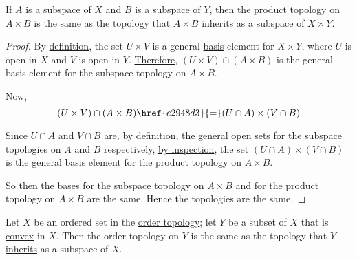 If $A$ is a \href{cddfbd8}{subspace} of $X$ and $B$ is a subspace of $Y$, then
the \href{be6372e}{product topology} on $A\times B$ is the same as the topology
that $A\times B$ inherits as a subspace of $X\times Y$.

\begin{proof}
  By \href{be6372e}{definition}, the set $U\times V$ is a general
  \href{e896402}{basis} element for $X\times Y$, where $U$ is open in $X$ and
  $V$ is open in $Y$. \href{a4e8ce7}{Therefore}, $(U\times V)\cap(A\times B)$ is
  the general basis element for the subspace topology on $A\times B$.

  Now,
  $$
    (U\times V)\cap(A\times B)\href{e2948d3}{=}(U\cap A)\times(V\cap B)
  $$

  Since $U\cap A$ and $V\cap B$ are, by \href{cddfbd8}{definition}, the general
  open sets for the subspace topologies on $A$ and $B$ respectively,
  \href{be6372e}{by inspection}, the set $(U\cap A)\times(V\cap B)$ is the
  general basis element for the product topology on $A\times B$.

  So then the bases for the subspace topology on $A\times B$ and for the
  product topology on $A\times B$ are the same. Hence the topologies are the
  same.
\end{proof}

\label{bcd8371}

Let $X$ be an ordered set in the \href{aaff6da}{order topology}; let $Y$ be a
subset of $X$ that is \href{c19c232}{convex} in $X$. Then the order topology on
$Y$ is the same as the topology that $Y$ \href{cddfbd8}{inherits} as a subspace
of $X$.

